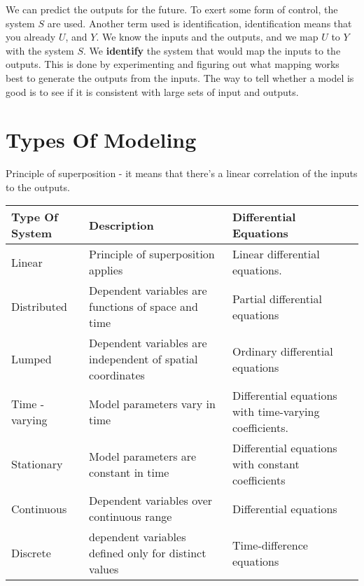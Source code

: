 \documentclass[11pt]{report}
\begin{document}
We can predict the outputs for the future. To exert some form of control, the system \(S\) are used. Another term used is identification, identification means that you already \(U\), and \(Y\). We know the inputs and the outputs, and we map \(U\) to \(Y\) with the system \(S\). We \textbf{identify} the system that would map the inputs to the outputs. This is done by experimenting and figuring out what mapping works best to generate the outputs from the inputs. The way to tell whether a model is good is to see if it is consistent with large sets of input and outputs.
\section{Types Of Modeling}
\label{sec:orgbdabae6}
Principle of superposition - it means that there's a linear correlation of the inputs to the outputs.
\begin{center}
\begin{tabular}{lll}
\hline
Type Of System & Description & Differential Equations\\
\hline
Linear & Principle of superposition applies & Linear differential equations.\\
Distributed & Dependent variables are functions of space and time & Partial differential equations\\
Lumped & Dependent variables are independent of spatial coordinates & Ordinary differential equations\\
Time - varying & Model parameters vary in time & Differential equations with time-varying coefficients.\\
Stationary & Model parameters are constant in time & Differential equations with constant coefficients\\
Continuous & Dependent variables over continuous range & Differential equations\\
Discrete & dependent variables defined only for distinct values & Time-difference equations\\
\hline
\end{tabular}
\end{center}
\end{document}

